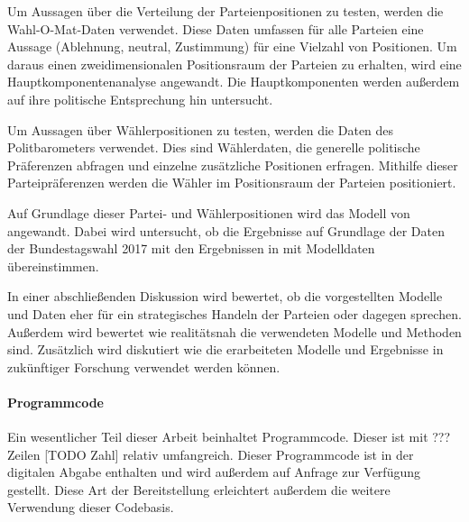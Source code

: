 Um Aussagen über die Verteilung der Parteienpositionen zu testen, werden die Wahl-O-Mat-Daten \citep{WahlOMat} verwendet. Diese Daten umfassen für alle Parteien eine Aussage (Ablehnung, neutral, Zustimmung) für eine Vielzahl von Positionen. Um daraus einen zweidimensionalen Positionsraum der Parteien zu erhalten, wird eine Hauptkomponentenanalyse angewandt. Die Hauptkomponenten werden außerdem auf ihre politische Entsprechung hin untersucht.

Um Aussagen über Wählerpositionen zu testen, werden die Daten des Politbarometers \citep{politbarometer} verwendet. Dies sind Wählerdaten, die generelle politische Präferenzen abfragen und einzelne zusätzliche Positionen erfragen. Mithilfe dieser Parteipräferenzen werden die Wähler im Positionsraum der Parteien positioniert.

Auf Grundlage dieser Partei- und Wählerpositionen wird das Modell von \citet{laver2005policy} angewandt. Dabei wird untersucht, ob die Ergebnisse auf Grundlage der Daten der Bundestagswahl 2017 mit den Ergebnissen in \citet{laver2005policy} mit Modelldaten übereinstimmen.

In einer abschließenden Diskussion wird bewertet, ob die vorgestellten Modelle und Daten eher für ein strategisches Handeln der Parteien oder dagegen sprechen. Außerdem wird bewertet wie realitätsnah die verwendeten Modelle und Methoden sind. Zusätzlich wird diskutiert wie die erarbeiteten Modelle und Ergebnisse in zukünftiger Forschung verwendet werden können.

\paragraph{Programmcode}
Ein wesentlicher Teil dieser Arbeit beinhaltet Programmcode. Dieser ist mit ??? Zeilen [TODO Zahl] relativ umfangreich. Dieser Programmcode ist in der digitalen Abgabe enthalten und wird außerdem auf Anfrage zur Verfügung gestellt. Diese Art der Bereitstellung erleichtert außerdem die weitere Verwendung dieser Codebasis.
